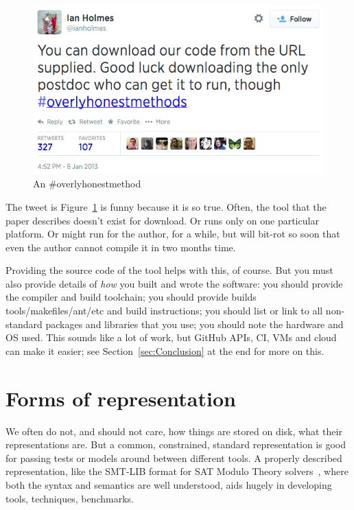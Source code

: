 \documentclass[conference]{IEEEtran}
\begin{document}
\begin{figure}[!ht]
\centering
\includegraphics[width=\columnwidth]{overlyhonesttweet.png}
\caption{An \#overlyhonestmethod}
\label{fig:overlyhonestmethod} 
\end{figure}

The tweet is Figure~\ref{fig:overlyhonestmethod} is funny because it
is so true. Often, the tool that the paper describes doesn't exist for
download. Or runs only on one particular platform. Or might run for
the author, for a while, but will bit-rot so soon that even the author
cannot compile it in two months time.

Providing the source code of the tool helps with this, of course. But
you must also provide details of \emph{how} you built and wrote the
software:
%
you should provide the compiler and build toolchain; 
%
you should provide builds tools/makefiles/ant/etc and build instructions; 
%
you should list or link to all non-standard packages and libraries that you use; 
%
you should note the hardware and OS used. 
%
This sounds like a lot of work, but GitHub APIs, CI, VMs and cloud can
make it easier; see Section~\ref{sec:Conclusion} at the end for more
on this.


\section{Forms of representation}


We often do not, and should not care, how things are stored on disk,
what their representations are. But a common, constrained, standard
representation is good for passing tests or models around between
different tools. A properly described representation, like the SMT-LIB
format for SAT Modulo Theory solvers~\cite{smtlib}, where both the
syntax and semantics are well understood, aids hugely in developing
tools, techniques, benchmarks.
\end{document}
